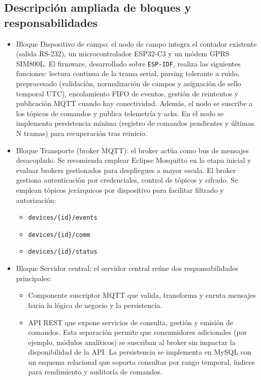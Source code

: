 \subsection{Descripción ampliada de bloques y responsabilidades}
\begin{itemize}

  \item {Bloque  Dispositivo de campo:} el nodo de campo integra el contador existente (salida RS-232), un microcontrolador ESP32-C3 y un módem GPRS SIM800L. El firmware, desarrollado sobre \texttt{ESP-IDF}, realiza las siguientes funciones: lectura continua de la trama serial, parsing tolerante a ruido, preprocesado (validación, normalización de campos y asignación de sello temporal UTC), encolamiento FIFO de eventos, gestión de reintentos y publicación MQTT cuando hay conectividad. Además, el nodo se suscribe a los tópicos de comandos y publica telemetría y acks. En el nodo se implementa persistencia mínima (registro de comandos pendientes y últimas N tramas) para recuperación tras reinicio.

  \item {Bloque Transporte (broker MQTT):} el broker actúa como bus de mensajes desacoplado. Se recomienda emplear Eclipse Mosquitto en la etapa inicial y evaluar brokers gestionados para despliegues a mayor escala. El broker gestiona autenticación por credenciales, control de tópicos y cifrado. Se emplean tópicos jerárquicos por dispositivo para facilitar filtrado y autorización: 

\begin{itemize}
  \item \texttt{devices/\{id\}/events}
  \item \texttt{devices/\{id\}/comm} 
  \item \texttt{devices/\{id\}/status}
\end{itemize}




\item {Bloque Servidor central:} el servidor central reúne dos responsabilidades principales: 

\begin{itemize}  

\item  Componente suscriptor MQTT que valida, transforma y enruta mensajes hacia la lógica de negocio y la persistencia.

\item API REST que expone servicios de consulta, gestión y emisión de comandos. Esta separación permite que consumidores adicionales (por ejemplo, módulos analíticos) se suscriban al broker sin impactar la disponibilidad de la API. La persistencia se implementa en MySQL con un esquema relacional que soporta consultas por rango temporal, índices para rendimiento y auditoría de comandos.
 \end{itemize}


\end{itemize}
